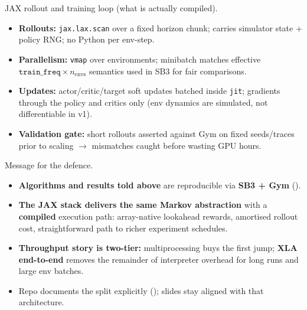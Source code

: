 \documentclass[11pt,aspectratio=43]{beamer}
\begin{document}
\begin{frame}{JAX rollout and training loop (what is actually compiled).}

  \begin{itemize}
    \setlength{\itemsep}{0.7em}
    \item \textbf{Rollouts:} \texttt{jax.lax.scan} over a fixed horizon chunk; carries simulator state +
          policy RNG; no Python per env-step.
    \item \textbf{Parallelism:} \texttt{vmap} over environments; minibatch matches effective
          $\texttt{train\_freq} \times n_{\mathrm{envs}}$ semantics used in SB3 for fair comparisons.
    \item \textbf{Updates:} actor/critic/target soft updates batched inside \texttt{jit}; gradients through
          the policy and critics only (env dynamics are simulated, not differentiable in v1).
    \item \textbf{Validation gate:} short rollouts asserted against Gym on fixed seeds/traces prior to
          scaling $\rightarrow$ mismatches caught before wasting GPU hours.
  \end{itemize}

\end{frame}

\begin{frame}{Message for the defence.}

  \begin{itemize}
    \setlength{\itemsep}{1.0em}
    \item \textbf{Algorithms and results told above} are reproducible via \textbf{SB3 + Gym}
          (\texttt{}).
    \item \textbf{The JAX stack delivers the same Markov abstraction} with a \textbf{compiled} execution path:
          array-native lookahead rewards, amortised rollout cost, straightforward path to richer experiment schedules.
    \item \textbf{Throughput story is two-tier:} multiprocessing buys the first jump; \textbf{XLA end-to-end}
          removes the remainder of interpreter overhead for long runs and large env batches.
    \item Repo documents the split explicitly (\texttt{}); slides stay aligned with that architecture.
  \end{itemize}

\end{frame}
\end{document}
